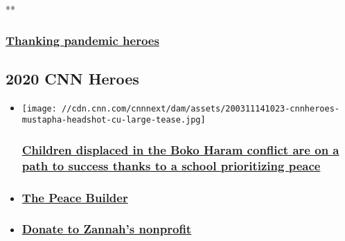 **

\hypertarget{thanking-pandemic-heroes}{%
\subsubsection{\texorpdfstring{\href{/videos/tv/2020/06/25/coronavirus-good-job-challenge-seven-cnnheroes.cnn}{Thanking
pandemic
heroes}}{Thanking pandemic heroes}}\label{thanking-pandemic-heroes}}

\hypertarget{2020-cnn-heroes-}{%
\subsection{2020 CNN Heroes~}\label{2020-cnn-heroes-}}

\begin{itemize}
\item
  \href{/2020/03/12/world/nigeria-boko-haram-conflict-children-school-cnnheroes/index.html}{}

  \texttt{[image: //cdn.cnn.com/cnnnext/dam/assets/200311141023-cnnheroes-mustapha-headshot-cu-large-tease.jpg]}

  \hypertarget{children-displaced-in-the-boko-haram-conflict-are-on-a-path-to-success-thanks-to-a-school-prioritizing-peace}{%
  \subsubsection{\texorpdfstring{\href{/2020/03/12/world/nigeria-boko-haram-conflict-children-school-cnnheroes/index.html}{Children
  displaced in the Boko Haram conflict are on a path to success thanks
  to a school prioritizing
  peace}}{Children displaced in the Boko Haram conflict are on a path to success thanks to a school prioritizing peace}}\label{children-displaced-in-the-boko-haram-conflict-are-on-a-path-to-success-thanks-to-a-school-prioritizing-peace}}
\item
  \hypertarget{the-peace-builder}{%
  \subsubsection{\texorpdfstring{\href{/videos/world/2020/03/12/nigeria-boko-haram-orphans-school-cnnheroes.cnn}{The
  Peace Builder}}{The Peace Builder}}\label{the-peace-builder}}
\item
  \hypertarget{donate-to-zannahs-nonprofit}{%
  \subsubsection{\texorpdfstring{\href{https://charity.gofundme.com/donate/project/zannah-mustapha-future-prowess-islamic-foundation-school/zannahmustapha}{Donate
  to Zannah's
  nonprofit}}{Donate to Zannah's nonprofit}}\label{donate-to-zannahs-nonprofit}}
\end{itemize}

